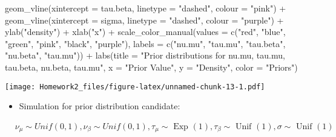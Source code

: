 \documentclass[
]{article}
\newenvironment{Shaded}{\begin{snugshade}}{\end{snugshade}}
\newcommand{\AttributeTok}[1]{\textcolor[rgb]{0.77,0.63,0.00}{#1}}
\newcommand{\FunctionTok}[1]{\textcolor[rgb]{0.00,0.00,0.00}{#1}}
\newcommand{\NormalTok}[1]{#1}
\newcommand{\SpecialCharTok}[1]{\textcolor[rgb]{0.00,0.00,0.00}{#1}}
\newcommand{\StringTok}[1]{\textcolor[rgb]{0.31,0.60,0.02}{#1}}
\providecommand{\tightlist}{%
  \setlength{\itemsep}{0pt}\setlength{\parskip}{0pt}}
\begin{document}
\begin{Shaded}
\begin{Highlighting}[]
  \FunctionTok{geom\_vline}\NormalTok{(}\AttributeTok{xintercept =}\NormalTok{ tau.beta, }\AttributeTok{linetype =} \StringTok{"dashed"}\NormalTok{, }\AttributeTok{colour =} \StringTok{"pink"}\NormalTok{) }\SpecialCharTok{+}
  \FunctionTok{geom\_vline}\NormalTok{(}\AttributeTok{xintercept =}\NormalTok{ sigma, }\AttributeTok{linetype =} \StringTok{"dashed"}\NormalTok{, }\AttributeTok{colour =} \StringTok{"purple"}\NormalTok{) }\SpecialCharTok{+}
  \FunctionTok{ylab}\NormalTok{(}\StringTok{"density"}\NormalTok{) }\SpecialCharTok{+} 
  \FunctionTok{xlab}\NormalTok{(}\StringTok{"x"}\NormalTok{) }\SpecialCharTok{+} 
  \FunctionTok{scale\_color\_manual}\NormalTok{(}\AttributeTok{values =} \FunctionTok{c}\NormalTok{(}\StringTok{"red"}\NormalTok{, }\StringTok{"blue"}\NormalTok{, }\StringTok{"green"}\NormalTok{, }\StringTok{"pink"}\NormalTok{, }\StringTok{"black"}\NormalTok{, }\StringTok{"purple"}\NormalTok{), }
                     \AttributeTok{labels =} \FunctionTok{c}\NormalTok{(}\StringTok{"nu.mu"}\NormalTok{, }\StringTok{"tau.mu"}\NormalTok{, }\StringTok{"tau.beta"}\NormalTok{, }\StringTok{"nu.beta"}\NormalTok{, }\StringTok{"tau.mu"}\NormalTok{)) }\SpecialCharTok{+}
  \FunctionTok{labs}\NormalTok{(}\AttributeTok{title =} \StringTok{"Prior distributions for nu.mu, tau.mu, tau.beta, nu.beta, tau.mu"}\NormalTok{,}
       \AttributeTok{x =} \StringTok{"Prior Value"}\NormalTok{,}
       \AttributeTok{y =} \StringTok{"Density"}\NormalTok{,}
       \AttributeTok{color =} \StringTok{"Priors"}\NormalTok{)}
\end{Highlighting}
\end{Shaded}

\texttt{[image: Homework2\_files/figure-latex/unnamed-chunk-13-1.pdf]}

\begin{itemize}
\tightlist
\item
  Simulation for prior distribution candidate:
\end{itemize}

\[
\begin{aligned}
& \nu_\mu \sim Unif(0,1), \nu_\beta \sim Unif(0,1), \tau_\mu \sim \text { Exp }(1), \tau_\beta \sim \text { Unif }(1), \sigma \sim \text { Unif }(1)
\end{aligned}
\]
\end{document}
